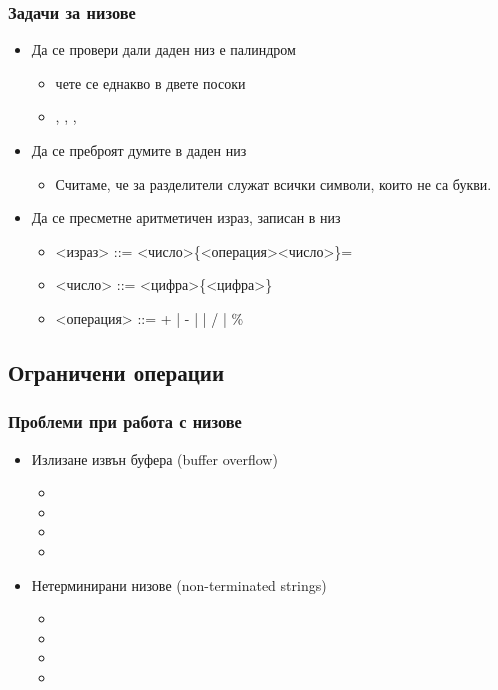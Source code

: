 \documentclass[alsotrans]{beamerswitch}
\begin{document}
\begin{frame}
  \frametitle{Задачи за низове}

  \begin{itemize}[<+->]
  \item Да се провери дали даден низ е \alert{палиндром}
    \begin{itemize}
    \item чете се еднакво в двете посоки
    \item {}, , , 
    \end{itemize}
  \item Да се преброят думите в даден низ
    \begin{itemize}
    \item Считаме, че за разделители служат всички символи, които не са букви.
    \end{itemize}
  \item Да се пресметне аритметичен израз, записан в низ
    \begin{itemize}
    \item{} <израз> ::= <число>\{<операция><число>\}\tta=
    \item{} <число> ::= <цифра>\{<цифра>\}
    \item{} <операция> ::= \tta+ | \tta- | \tta* | \tta/ | \tta\%
    \end{itemize}
  \end{itemize}
\end{frame}

\subsection{Ограничени операции}

\begin{frame}
  \frametitle{Проблеми при работа с низове}

  \begin{itemize}[<+->]
  \item Излизане извън буфера (buffer overflow)
    \begin{itemize}
    \item {}
    \item {}
    \item {}
    \item {}
    \end{itemize}
  \item Нетерминирани низове (non-terminated strings)
    \begin{itemize}
    \item {}
    \item {}
    \item {}
    \item {}
    \end{itemize}
  \end{itemize}
\end{frame}
\end{document}

